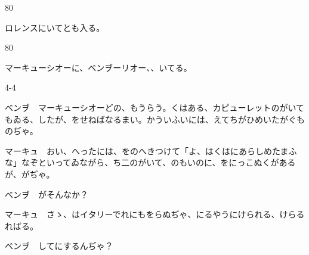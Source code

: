 \documentclass[tate,paper=b6j,jafontsize=9pt]{jlreq}
\begin{document}
\begin{azconvIndented}{8\zw}{0\zw}

ロレンスにいてとも入る。

\end{azconvIndented}



\begin{azconvIndented}{8\zw}{0\zw}

マーキューシオーに、ベンヺーリオー、、いてる。

\end{azconvIndented}
\begin{azconvIndented}{4\zw}{-4\zw}

ベンヺ　マーキューシオーどの、もうらう。くはある、カピューレットのがいてもゐる、したが、をせねばなるまい。かういふいには、えてちがひめいたがぐものぢゃ。

マーキュ　おい、へったには、をのへきつけて「よ、はくはにあらしめたまふな」なぞといってゐながら、ち二のがいて、のもいのに、をにっこぬくがあるが、がぢゃ。

ベンヺ　がそんなか？

マーキュ　さゝ、はイタリーでれにもをらぬぢゃ、にるやうにけられる、けらるればる。

ベンヺ　してにするんぢゃ？

\end{azconvIndented}
\end{document}
